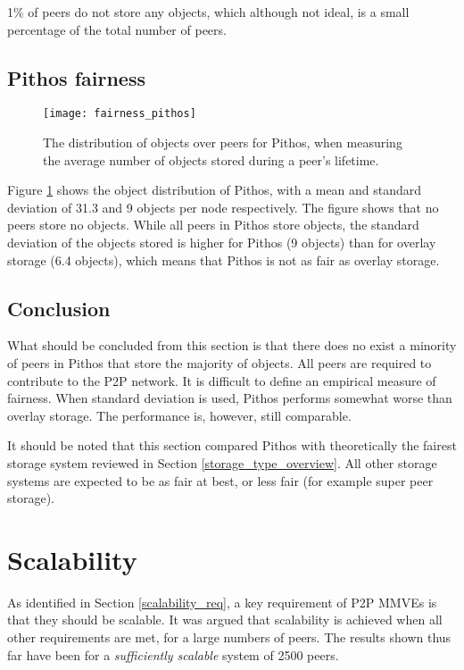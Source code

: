 1\% of peers do not store any objects, which although not ideal, is a small percentage of the total number of peers.

\subsection{Pithos fairness}

\begin{figure}[htbp]
 \centering
 \texttt{[image: fairness\_pithos]}
 \caption{The distribution of objects over peers for Pithos, when measuring the average number of objects stored during a peer's lifetime.}
 \label{fig_pithos_fairness}
\end{figure}
%
Figure \ref{fig_pithos_fairness} shows the object distribution of Pithos, with a mean and standard deviation of 31.3 and 9 objects per node respectively. The figure shows that no peers store no objects. While all peers in Pithos store objects, the standard deviation of the objects stored is higher for Pithos (9 objects) than for overlay storage (6.4 objects), which means that Pithos is not as fair as overlay storage.

\subsection{Conclusion}
What should be concluded from this section is that there does no exist a minority of peers in Pithos that store the majority of objects. All peers are required to contribute to the P2P network. It is difficult to define an empirical measure of fairness. When standard deviation is used, Pithos performs somewhat worse than overlay storage. The performance is, however, still comparable.

It should be noted that this section compared Pithos with theoretically the fairest storage system reviewed in Section \ref{storage_type_overview}. All other storage systems are expected to be as fair at best, or less fair (for example super peer storage).

\section{Scalability}

As identified in Section \ref{scalability_req}, a key requirement of P2P MMVEs is that they should be scalable. It was argued that scalability is achieved when all other requirements are met, for a large numbers of peers. The results shown thus far have been for a \emph{sufficiently scalable} system of 2500 peers.

